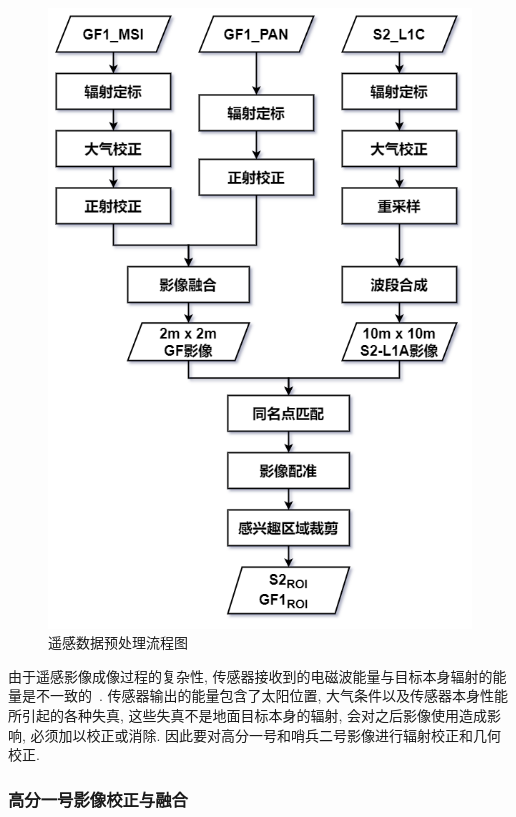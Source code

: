 \begin{figure}[!htbp]
    \centering
    \includegraphics[height=0.70\textheight]{pic/chap02-06.png}
    \caption{遥感数据预处理流程图}
    \label{fig:0206}
\end{figure}

由于遥感影像成像过程的复杂性, 传感器接收到的电磁波能量与目标本身辐射的能量是不一致的~\cite{RSbook01}. 传感器输出的能量包含了太阳位置, 大气条件以及传感器本身性能所引起的各种失真, 这些失真不是地面目标本身的辐射, 会对之后影像使用造成影响, 必须加以校正或消除. 因此要对高分一号和哨兵二号影像进行辐射校正和几何校正.

\subsubsection{高分一号影像校正与融合}


